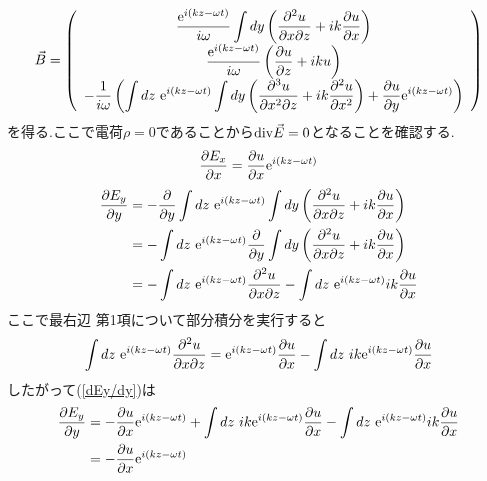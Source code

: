 \documentclass[uplatex,a4j,11pt,dvipdfmx]{jsarticle}
\numberwithin{equation}{section}
\begin{document}
\begin{align}
  \vec{B}=\left(
    \begin{array}[1]{c}
      \displaystyle
      \frac{{\rm e}^{i(kz-\omega t)}}{i\omega}\int dy\left(\frac{\partial^2u}{\partial x\partial z}+ik\frac{\partial u}{\partial x}\right)\\
      \displaystyle
      \frac{{\rm e}^{i(kz-\omega t)}}{i\omega}\left(\frac{\partial u}{\partial z}+iku\right)\\
      \displaystyle
      -\frac{1}{i\omega}\left(\int dz\ {\rm e}^{i(kz-\omega t)}\int dy\left(
      \frac{\partial^3u}{\partial x^2\partial z}+ik\frac{\partial^2u}{\partial x^2}
      \right)+\frac{\partial u}{\partial y}{\rm e}^{i(kz-\omega t)}\right)\\
    \end{array}
  \right)
\end{align}
を得る.ここで電荷$\rho=0$であることから${\rm div}\vec{E}=0$となることを確認する.
\begin{align}
  \frac{\partial E_x}{\partial x}=\frac{\partial u}{\partial x}{\rm e}^{i(kz-\omega t)}
\end{align}
\begin{align}
  \label{dEy/dy}
  \begin{split}
    \frac{\partial E_y}{\partial y}&=-\frac{\partial}{\partial y}\int dz\ {\rm e}^{i(kz-\omega t)}\int dy\left(\frac{\partial^2u}{\partial x\partial z}+ik\frac{\partial u}{\partial x}\right)\\
    &=-\int dz\ {\rm e}^{i(kz-\omega t)}\frac{\partial}{\partial y}\int dy\left(\frac{\partial^2u}{\partial x\partial z}+ik\frac{\partial u}{\partial x}\right)\\
    &=-\int dz\ {\rm e}^{i(kz-\omega t)}\frac{\partial^2u}{\partial x\partial z}-\int dz\ {\rm e}^{i(kz-\omega t)}ik\frac{\partial u}{\partial x}\\
  \end{split}
\end{align}
ここで最右辺 第1項について部分積分を実行すると
\begin{align}
  \begin{split}
    \int dz\ {\rm e}^{i(kz-\omega t)}\frac{\partial^2u}{\partial x\partial z}={\rm e}^{i(kz-\omega t)}\frac{\partial u}{\partial x}-\int dz\ ik{\rm e}^{i(kz-\omega t)}\frac{\partial u}{\partial x}
  \end{split}
\end{align}
したがって(\ref{dEy/dy})は
\begin{align}
  \begin{split}
    \frac{\partial E_y}{\partial y}&=-\frac{\partial u}{\partial x}{\rm e}^{i(kz-\omega t)}+\int dz\ ik{\rm e}^{i(kz-\omega t)}\frac{\partial u}{\partial x}-\int dz\ {\rm e}^{i(kz-\omega t)}ik\frac{\partial u}{\partial x}\\
    &=-\frac{\partial u}{\partial x}{\rm e}^{i(kz-\omega t)}
  \end{split}
\end{align}
\end{document}

